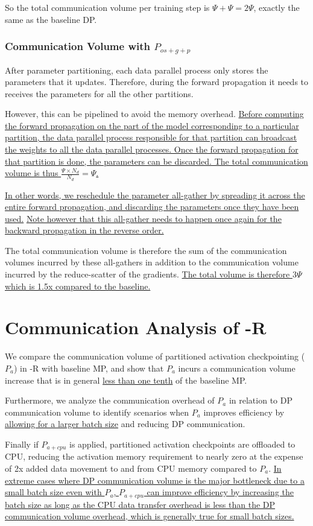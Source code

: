 So the total communication volume per training step is $\Psi+\Psi= 2\Psi$, exactly the same as the baseline DP.

\subsubsection{Communication Volume with $P_{os+g+p}$ }

After parameter partitioning, each data parallel process only stores the parameters that it updates. Therefore, during the forward propagation it needs to receives the parameters for all the other partitions.

However, this can be pipelined to avoid the memory overhead. \uline{Before computing the forward propagation on the part of the model corresponding to a particular partition, the data parallel process responsible for that partition can broadcast the weights to all the data parallel processes. Once the forward propagation for that partition is done, the parameters can be discarded. The total communication volume is thus $\frac{\Psi \times N_d}{N_d} = \Psi$.}

\uline{In other words, we reschedule the parameter all-gather by spreading it across the entire forward propagation, and discarding the parameters once they have been used.} \uline{Note however that this all-gather needs to happen once again for the backward propagation in the reverse order.}

The total communication volume is therefore the sum of the communication volumes incurred by these all-gathers in addition to the communication volume incurred by the reduce-scatter of the gradients. \uline{The total volume is therefore $3\Psi$ which is 1.5x compared to the baseline.}

\section{Communication Analysis of \name-R}
We compare the communication volume of partitioned activation checkpointing ($P_a$) in \name-R with baseline MP, and show that $P_a$ incurs a communication volume increase that is in general \uline{less than one tenth} of the baseline MP.

Furthermore, we analyze the communication overhead of $P_a$ in relation to DP communication volume to identify scenarios when $P_a$ improves efficiency by \uline{allowing for a larger batch size} and reducing DP communication.

Finally if $P_{a+cpu}$ is applied, partitioned activation checkpoints are offloaded to CPU, reducing the activation memory requirement to nearly zero at the expense of 2x added data movement to and from CPU memory compared to $P_a$. \uline{In extreme cases where DP communication volume is the major bottleneck due to a small batch size even with $P_a$, $P_{a+cpu}$ can improve efficiency by increasing the batch size as long as the CPU data transfer overhead is less than the DP communication volume overhead, which is generally true for small batch sizes.}